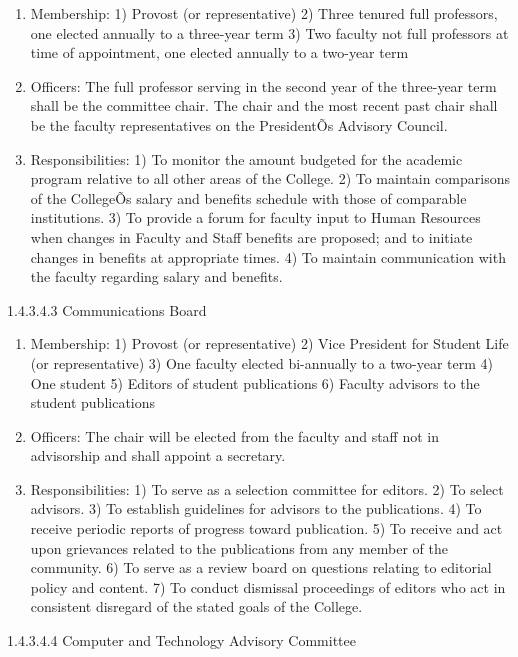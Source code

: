 \documentclass[letterpaper, 11pt]{article}
\begin{document}
				\begin{enumerate}[label=\alph*)]
					\item{Membership:}
					1) Provost (or representative)
					2) Three tenured full professors, one elected annually to a three-year term
					3) Two faculty not full professors at time of appointment, one elected annually to a two-year term
					\item{Officers:}
					The full professor serving in the second year of the three-year term shall be the committee chair.  The chair and the most recent past chair shall be the faculty representatives on the PresidentÕs Advisory Council.
					\item{Responsibilities:}
					1) To monitor the amount budgeted for the academic program relative to all other areas of the College.
					2) To maintain comparisons of the CollegeÕs salary and benefits schedule with those of comparable institutions.
					3) To provide a forum for faculty input to Human Resources when changes in Faculty and Staff benefits are proposed; and to initiate changes in benefits at appropriate times.
					4) To maintain communication with the faculty regarding salary and benefits.
				\end{enumerate}
				1.4.3.4.3 Communications Board
				\begin{enumerate}[label=\alph*)]
					\item{Membership:}
					1) Provost (or representative)
					2) Vice President for Student Life (or representative)
					3) One faculty elected bi-annually to a two-year term
					4) One student
					5) Editors of student publications
					6) Faculty advisors to the student publications
					\item{Officers:}
					The chair will be elected from the faculty and staff not in advisorship and shall appoint a secretary.
					\item{Responsibilities:}
					1) To serve as a selection committee for editors.
					2) To select advisors.
					3) To establish guidelines for advisors to the publications.
					4) To receive periodic reports of progress toward publication.
					5) To receive and act upon grievances related to the publications from any member of the community.
					6) To serve as a review board on questions relating to editorial policy and content.
					7) To conduct dismissal proceedings of editors who act in consistent disregard of the stated goals of the College.
				\end{enumerate}
				1.4.3.4.4 Computer and Technology Advisory Committee
\end{document}
